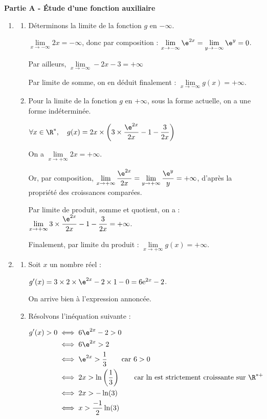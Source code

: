 
\medskip

\textbf{Partie A - Étude d'une fonction auxiliaire}

\medskip

\begin{enumerate}
\item 
	\begin{enumerate}
		\item Déterminons la limite de la fonction $g$ en $-\infty$.

$\lim\limits_{x \to -\infty} 2x = -\infty$, donc par composition : $\lim\limits_{x \to -\infty} \e^{2x} = \lim\limits_{y \to -\infty} \e^{y} = 0$.

Par ailleurs, $\lim\limits_{x \to -\infty} -2x - 3 = +\infty$

Par limite de somme, on en déduit finalement : $\lim\limits_{x \to -\infty} g(x) = +\infty$.

		\item Pour la limite de la fonction $g$ en $+\infty$, sous la forme actuelle, on a une forme indéterminée.

$\forall x \in \R^*, \quad g(x) = 2x \times \left(3 \times \dfrac{\e^{2x}}{2x} - 1 - \dfrac{3}{2x}\right)$

On a $\lim\limits_{x \to +\infty} 2x = +\infty$.

Or, par composition, $\lim\limits_{x \to +\infty} \dfrac{\e^{2x}}{2x} = \lim\limits_{y \to +\infty} \dfrac{\e^y}{y} = +\infty$, d'après la propriété des croissances comparées.

Par limite de produit, somme et quotient, on a : $\lim\limits_{x \to +\infty} 3\times \dfrac{\e^{2x}}{2x} - 1 - \dfrac{3}{2x} = +\infty$.

Finalement, par limite du produit : $\lim\limits_{x \to +\infty}g(x) = +\infty$.
	\end{enumerate}
\item 
	\begin{enumerate}
		\item Soit $x$ un nombre réel :

$g'(x) = 3 \times 2 \times \e^{2x} - 2\times 1 - 0 = 6 \mathrm{e}^{2 x}-2$.

On arrive bien à l'expression annoncée.

		\item Résolvons l'inéquation suivante :

$\aligned g'(x) > 0 &\iff 6\e^{2x}-2 > 0\\
&\iff 6\e^{2x} > 2\\
&\iff \e^{2x} > \dfrac{1}{3} \qquad \text{car }6 > 0\\
&\iff 2x > \ln\left(\dfrac{1}{3}\right) \qquad \text{car ln est strictement croissante sur } \R^{*+}\\
&\iff 2x > -\ln(3)\\
&\iff x > \dfrac{-1}{2}\ln(3)
\\ \endaligned$


\end{enumerate}
\end{enumerate}
